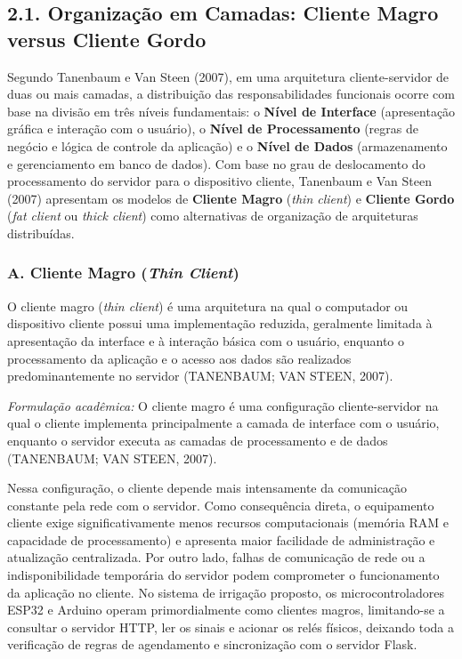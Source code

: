 \vspace{1em}

\subsection*{2.1. Organização em Camadas: Cliente Magro versus Cliente Gordo}

Segundo Tanenbaum e Van Steen (2007), em uma arquitetura cliente-servidor de duas ou mais camadas, a distribuição das responsabilidades funcionais ocorre com base na divisão em três níveis fundamentais: o \textbf{Nível de Interface} (apresentação gráfica e interação com o usuário), o \textbf{Nível de Processamento} (regras de negócio e lógica de controle da aplicação) e o \textbf{Nível de Dados} (armazenamento e gerenciamento em banco de dados). Com base no grau de deslocamento do processamento do servidor para o dispositivo cliente, Tanenbaum e Van Steen (2007) apresentam os modelos de \textbf{Cliente Magro} (\textit{thin client}) e \textbf{Cliente Gordo} (\textit{fat client} ou \textit{thick client}) como alternativas de organização de arquiteturas distribuídas.

\subsubsection*{A. Cliente Magro (\textit{Thin Client})}

O cliente magro (\textit{thin client}) é uma arquitetura na qual o computador ou dispositivo cliente possui uma implementação reduzida, geralmente limitada à apresentação da interface e à interação básica com o usuário, enquanto o processamento da aplicação e o acesso aos dados são realizados predominantemente no servidor (TANENBAUM; VAN STEEN, 2007).

\textit{Formulação acadêmica:} O cliente magro é uma configuração cliente-servidor na qual o cliente implementa principalmente a camada de interface com o usuário, enquanto o servidor executa as camadas de processamento e de dados (TANENBAUM; VAN STEEN, 2007).

Nessa configuração, o cliente depende mais intensamente da comunicação constante pela rede com o servidor. Como consequência direta, o equipamento cliente exige significativamente menos recursos computacionais (memória RAM e capacidade de processamento) e apresenta maior facilidade de administração e atualização centralizada. Por outro lado, falhas de comunicação de rede ou a indisponibilidade temporária do servidor podem comprometer o funcionamento da aplicação no cliente. No sistema de irrigação proposto, os microcontroladores ESP32 e Arduino operam primordialmente como clientes magros, limitando-se a consultar o servidor HTTP, ler os sinais e acionar os relés físicos, deixando toda a verificação de regras de agendamento e sincronização com o servidor Flask.

